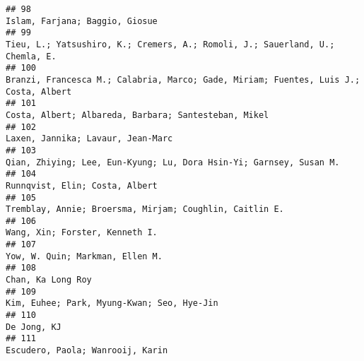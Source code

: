 \documentclass[
  english,
  man]{apa6}
\begin{document}
\begin{verbatim}
## 98                                                                                                                                                            Islam, Farjana; Baggio, Giosue
## 99                                                                                                              Tieu, L.; Yatsushiro, K.; Cremers, A.; Romoli, J.; Sauerland, U.; Chemla, E.
## 100                                                                                                     Branzi, Francesca M.; Calabria, Marco; Gade, Miriam; Fuentes, Luis J.; Costa, Albert
## 101                                                                                                                                     Costa, Albert; Albareda, Barbara; Santesteban, Mikel
## 102                                                                                                                                                        Laxen, Jannika; Lavaur, Jean-Marc
## 103                                                                                                                       Qian, Zhiying; Lee, Eun-Kyung; Lu, Dora Hsin-Yi; Garnsey, Susan M.
## 104                                                                                                                                                           Runnqvist, Elin; Costa, Albert
## 105                                                                                                                                  Tremblay, Annie; Broersma, Mirjam; Coughlin, Caitlin E.
## 106                                                                                                                                                           Wang, Xin; Forster, Kenneth I.
## 107                                                                                                                                                          Yow, W. Quin; Markman, Ellen M.
## 108                                                                                                                                                                        Chan, Ka Long Roy
## 109                                                                                                                                               Kim, Euhee; Park, Myung-Kwan; Seo, Hye-Jin
## 110                                                                                                                                                                              De Jong, KJ
## 111                                                                                                                                                         Escudero, Paola; Wanrooij, Karin

\end{verbatim}
\end{document}
